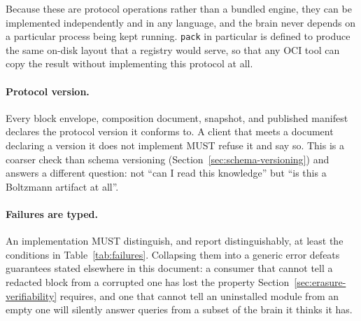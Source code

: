 \documentclass[11pt,a4paper]{article}
\begin{document}
Because these are protocol operations rather than a bundled engine, they can be
implemented independently and in any language, and the brain never depends on a
particular process being kept running. \texttt{pack} in particular is defined to
produce the same on-disk layout that a registry would serve, so that any OCI
tool can copy the result without implementing this protocol at all.

\paragraph{Protocol version.}
Every block envelope, composition document, snapshot, and published manifest
declares the protocol version it conforms to. A client that meets a document
declaring a version it does not implement MUST refuse it and say so. This is a
coarser check than schema versioning (Section~\ref{sec:schema-versioning}) and
answers a different question: not ``can I read this knowledge'' but ``is this a
Boltzmann artifact at all''.

\paragraph{Failures are typed.}
An implementation MUST distinguish, and report distinguishably, at least the
conditions in Table~\ref{tab:failures}. Collapsing them into a generic error
defeats guarantees stated elsewhere in this document: a consumer that cannot
tell a redacted block from a corrupted one has lost the property
Section~\ref{sec:erasure-verifiability} requires, and one that cannot tell an
uninstalled module from an empty one will silently answer queries from a subset
of the brain it thinks it has.
\end{document}
